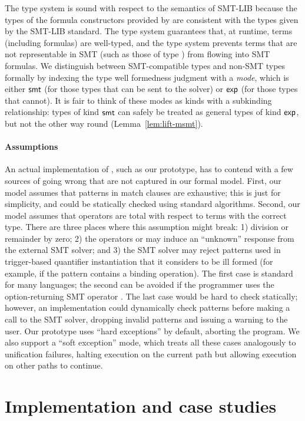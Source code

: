 \documentclass[acmsmall,screen,nonacm]{acmart}
\theoremstyle{definition}
\begin{document}
The type system is sound with respect to the semantics of SMT-LIB because the
types of the formula constructors provided by \Name are consistent with the
types given by the SMT-LIB standard. The \Name type system guarantees that, at
runtime, terms (including formulas) are well-typed, and the type system
prevents terms that are not representable in SMT (such as those of type \MODEL)
from flowing into SMT formulas.
We distinguish between SMT-compatible types and non-SMT types formally
by indexing the type well formedness judgment with a \emph{mode}, which is
either $\mathsf{smt}$ (for those types that can be sent to the solver) or $\mathsf{exp}$ (for
those types that cannot).
%
It is fair to think of these modes as kinds with a subkinding
relationship: types of kind $\mathsf{smt}$ can safely be treated as general types of kind
$\mathsf{exp}$, but not the other way round\iffull{} (Lemma~\ref{lem:lift-msmt})\fi.


\paragraph{Assumptions}
An actual implementation of \Name, such as our prototype, has to contend with a
few sources of going wrong that are not captured in our formal model.
First, our model assumes that patterns in match clauses are exhaustive; this
is just for simplicity, and could be statically checked using standard
algorithms.
Second, our model assumes that operators are total with respect to terms with
the correct type.
There are three places where this assumption might break:
1) division or remainder by zero;
2) the operators  or  may induce an ``unknown''
response from the external SMT solver; and
3) the SMT solver may reject patterns used in trigger-based quantifier
instantiation that it considers to be ill formed (for example, if the pattern
contains a binding operation).
The first case is standard for many languages; the second can be avoided if the
programmer uses the option-returning SMT operator .
The last case would be hard to check statically; however, an implementation could
dynamically check patterns before making a call to the SMT solver, dropping
invalid patterns and issuing a warning to the user.
Our prototype uses ``hard exceptions'' by default, aborting the program.
We also support a ``soft exception'' mode, which treats all these cases
analogously to unification failures, halting execution on the current path but
allowing execution on other paths to continue.

\section{Implementation and case studies}\label{sec:examples}
\end{document}
